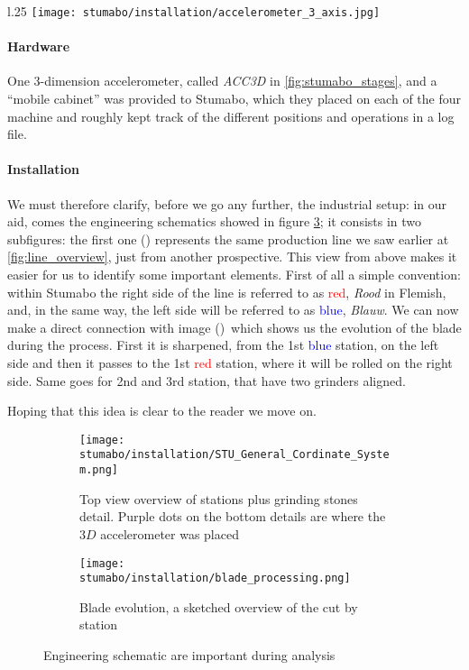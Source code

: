 \begin{wrapfigure}{l}{.25 \textwidth}
    \texttt{[image: stumabo/installation/accelerometer\_3\_axis.jpg]}
    \caption{industrial ACC3D}
    \label{fig:stumabo_acc3d}
\end{wrapfigure}
\paragraph{Hardware} One 3-dimension accelerometer, called \textit{ACC3D} in \ref{fig:stumabo_stages}, and a ``mobile cabinet'' was provided to Stumabo, which they placed on each of the four machine and roughly kept track of the different positions and operations in a log file.

\paragraph{Installation} We must therefore clarify, before we go any further, the industrial setup: in our aid, comes the engineering schematics showed in figure \ref{fig:engineering_files};
it consists in two subfigures: the first one () represents the same production line we saw earlier at \ref{fig:line_overview}, just from another prospective. 
This view from above makes it easier for us to identify some important elements. 
First of all a simple convention: within Stumabo the right side of the line is referred to as \textcolor{red}{red}, \textit{Rood} in Flemish, and, in the same way, the left side will be referred to as \textcolor{blue}{blue}, \textit{Blauw}.
We can now make a direct connection with image ()\, which shows us the evolution of the blade during the process.
First it is sharpened, from the 1st \textcolor{blue}{blue} station, on the left side and then it passes to the 1st \textcolor{red}{red} station, where it will be rolled on the right side. Same goes for 2nd and 3rd station, that have two grinders aligned. 

Hoping that this idea is clear to the reader we move on.

\begin{figure}[ht]
    \begin{subfigure}{\textwidth}
        \texttt{[image: stumabo/installation/STU\_General\_Cordinate\_System.png]}
        \caption{Top view overview of stations plus grinding stones detail.
            Purple dots on the bottom details are where the $3D$ accelerometer was placed}
        \label{fig:top_view_line}
    \end{subfigure}
    \begin{subfigure}{\textwidth}
        \texttt{[image: stumabo/installation/blade\_processing.png]}
        \caption{Blade evolution, a sketched overview of the cut by station}
        \label{fig:blade_evolution}
    \end{subfigure}
    \caption{Engineering schematic are important during analysis}
    \label{fig:engineering_files}
\end{figure}

